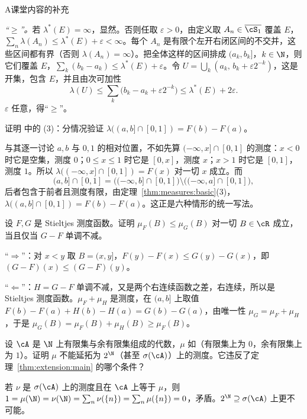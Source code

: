 \begin{exercises}{A}{课堂内容的补充}
\begin{questions}
\begin{solution}
\emph{“$\geqslant$”。}若 $\lambda^*(E)=\infty$，显然。否则任取 $\varepsilon>0$，由定义取 $A_n\in\overline{\cS_1}$ 覆盖 $E$，$\sum_n\lambda(A_n)\leqslant\lambda^*(E)+\varepsilon<\infty$。每个 $A_n$ 是有限个左开右闭区间的不交并，这些区间都有界（否则 $\lambda(A_n)=\infty$）。把全体这样的区间排成 $(a_k,b_k]$，$k\in\N$，则它们覆盖 $E$，$\sum_k(b_k-a_k)\leqslant\lambda^*(E)+\varepsilon$。令 $U=\bigcup_k(a_k,\,b_k+\varepsilon2^{-k})$，这是开集，包含 $E$，并且由次可加性
\[
\lambda(U)\leqslant\sum_k\bigl(b_k-a_k+\varepsilon2^{-k}\bigr)\leqslant\lambda^*(E)+2\varepsilon .
\]
$\varepsilon$ 任意，得“$\geqslant$”。
\end{solution}
\end{questions}

\item\label{ex:extension:A6} 证明 中的 (3)：分情况验证 $\lambda((a,b]\cap[0,1])=F(b)-F(a)$。
\begin{solution}
与其逐一讨论 $a,b$ 与 $0,1$ 的相对位置，不如先算 $(-\infty,x]\cap[0,1]$ 的测度：$x<0$ 时它是空集，测度 $0$；$0\leqslant x\leqslant1$ 时它是 $[0,x]$，测度 $x$；$x>1$ 时它是 $[0,1]$，测度 $1$。所以 $\lambda((-\infty,x]\cap[0,1])=F(x)$ 对一切 $x$ 成立。而
\[
(a,b]\cap[0,1]=\bigl((-\infty,b]\cap[0,1]\bigr)\setminus\bigl((-\infty,a]\cap[0,1]\bigr),
\]
后者包含于前者且测度有限，由定理~\ref{thm:measures:basic}(3)，$\lambda((a,b]\cap[0,1])=F(b)-F(a)$。这正是六种情形的统一写法。
\end{solution}

\item\label{ex:extension:A7} 设 $F,G$ 是 Stieltjes 测度函数。证明 $\mu_F(B)\leqslant\mu_G(B)$ 对一切 $B\in\cR$ 成立，当且仅当 $G-F$ 单调不减。
\begin{solution}
“$\Rightarrow$”：对 $x<y$ 取 $B=(x,y]$，$F(y)-F(x)\leqslant G(y)-G(x)$，即 $(G-F)(x)\leqslant(G-F)(y)$。

“$\Leftarrow$”：$H=G-F$ 单调不减，又是两个右连续函数之差，右连续，所以是 Stieltjes 测度函数。$\mu_F+\mu_H$ 是测度，在 $(a,b]$ 上取值 $F(b)-F(a)+H(b)-H(a)=G(b)-G(a)$，由唯一性 $\mu_G=\mu_F+\mu_H$，于是 $\mu_G(B)=\mu_F(B)+\mu_H(B)\geqslant\mu_F(B)$。
\end{solution}

\item\label{ex:extension:A8} 设 $\cA$ 是 $\N$ 上有限集与余有限集组成的代数，$\mu$ 如（有限集上为 $0$，余有限集上为 $1$）。证明 $\mu$ 不能延拓为 $2^\N$（甚至 $\sigma(\cA)$）上的测度。它违反了定理~\ref{thm:extension:main} 的哪个条件？
\begin{solution}
若 $\nu$ 是 $\sigma(\cA)$ 上的测度且在 $\cA$ 上等于 $\mu$，则 $1=\mu(\N)=\nu(\N)=\sum_n\nu(\{n\})=\sum_n\mu(\{n\})=0$，矛盾。$2^\N\supseteq\sigma(\cA)$ 上更不可能。


\end{solution}
\end{exercises}
